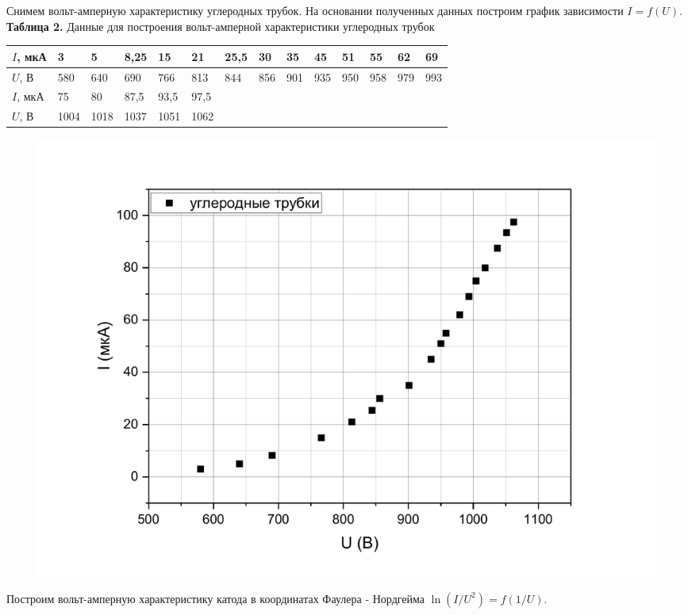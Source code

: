 \documentclass[12pt,a4paper]{article}
\begin{document}
Снимем вольт-амперную характеристику углеродных трубок. На основании полученных данных построим график зависимости $I = f(U)$.\\
\textbf{Таблица 2. }Данные для построения вольт-амперной характеристики углеродных трубок
\begin{table}[]
\begin{tabular}{|l|l|l|l|l|l|llllllll}
\hline
$I$, мкА & 3    & 5    & 8,25 & 15   & 21   & \multicolumn{1}{l|}{25,5} & \multicolumn{1}{l|}{30}  & \multicolumn{1}{l|}{35}  & \multicolumn{1}{l|}{45}  & \multicolumn{1}{l|}{51}  & \multicolumn{1}{l|}{55}  & \multicolumn{1}{l|}{62}  & \multicolumn{1}{l|}{69}  \\ \hline
$U$, В   & 580  & 640  & 690  & 766  & 813  & \multicolumn{1}{l|}{844}  & \multicolumn{1}{l|}{856} & \multicolumn{1}{l|}{901} & \multicolumn{1}{l|}{935} & \multicolumn{1}{l|}{950} & \multicolumn{1}{l|}{958} & \multicolumn{1}{l|}{979} & \multicolumn{1}{l|}{993} \\ \hline
$I$, мкА & 75   & 80   & 87,5 & 93,5 & 97,5 &                           &                          &                          &                          &                          &                          &                          &                          \\ \cline{1-6}
$U$, В   & 1004 & 1018 & 1037 & 1051 & 1062 &                           &                          &                          &                          &                          &                          &                          &                          \\ \cline{1-6}
\end{tabular}
\end{table}
\begin{figure}[H]
\centering
	\includegraphics[width=0.65\linewidth]{vakh_uglerod.pdf}
\end{figure}

Построим вольт-амперную характеристику катода в координатах Фаулера - Нордгейма $\ln(I/U^2) = f(1/U)$. 
\end{document}
